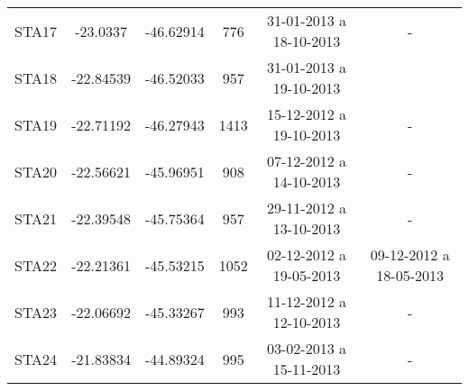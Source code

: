 \begin{table}[!Ht]
\begin{tabular}{| c | c | c | c | c | c |}
STA17 & -23.0337 & -46.62914 & 776 & 31-01-2013 a 18-10-2013 & - \\
STA18 & -22.84539 & -46.52033 & 957 & 31-01-2013 a 19-10-2013 & \\
STA19 & -22.71192 & -46.27943 & 1413 & 15-12-2012 a 19-10-2013 & - \\
STA20 & -22.56621 & -45.96951 & 908 & 07-12-2012 a 14-10-2013 & - \\
STA21 & -22.39548 & -45.75364 & 957 & 29-11-2012 a 13-10-2013 & - \\
STA22 & -22.21361 & -45.53215 & 1052 &  02-12-2012 a 19-05-2013 & 09-12-2012 a 18-05-2013 \\
STA23 & -22.06692 & -45.33267 & 993 & 11-12-2012 a 12-10-2013 & - \\
STA24 & -21.83834 & -44.89324 & 995 & 03-02-2013 a 15-11-2013 & - \\
\hline
\end{tabular}
\label{tabelaDATA}
\end{table}
